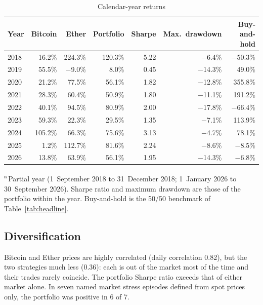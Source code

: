 \documentclass[11pt,a4paper]{article}
\newcommand{\1}{\mathbf{1}}
\begin{document}
\begin{table}[tbp]
\centering\small
\begin{threeparttable}
\caption{Calendar-year returns}\label{tab:annual}
\begin{tabular}{lrrrrrr}
\toprule
Year & Bitcoin & Ether & Portfolio & Sharpe & Max.~drawdown & Buy-and-hold \\
\midrule
2018\tnote{a} & 16.2\% & 224.3\% & 120.3\% & 5.22 & \ensuremath{-}6.4\% & \ensuremath{-}50.3\% \\
2019 & 55.5\% & \ensuremath{-}9.0\% & 8.0\% & 0.45 & \ensuremath{-}14.3\% & 49.0\% \\
2020 & 21.2\% & 77.5\% & 56.1\% & 1.82 & \ensuremath{-}12.8\% & 355.8\% \\
2021 & 28.3\% & 60.4\% & 50.9\% & 1.80 & \ensuremath{-}11.1\% & 191.2\% \\
2022 & 40.1\% & 94.5\% & 80.9\% & 2.00 & \ensuremath{-}17.8\% & \ensuremath{-}66.4\% \\
2023 & 59.3\% & 22.3\% & 29.5\% & 1.35 & \ensuremath{-}7.1\% & 113.9\% \\
2024 & 105.2\% & 66.3\% & 75.6\% & 3.13 & \ensuremath{-}4.7\% & 78.1\% \\
2025 & 1.2\% & 112.7\% & 81.6\% & 2.24 & \ensuremath{-}8.6\% & \ensuremath{-}8.5\% \\
2026\tnote{a} & 13.8\% & 63.9\% & 56.1\% & 1.95 & \ensuremath{-}14.3\% & \ensuremath{-}6.8\% \\
\bottomrule
\end{tabular}
\begin{tablenotes}[flushleft]\footnotesize
\item \textsuperscript{a}\,Partial year (1~September 2018 to 31~December 2018; 1~January 2026 to 30~September 2026). Sharpe ratio and maximum drawdown are those of the portfolio within the year. Buy-and-hold is the 50/50 benchmark of Table~\ref{tab:headline}.
\end{tablenotes}
\end{threeparttable}
\end{table}

\subsection{Diversification}

Bitcoin and Ether prices are highly correlated (daily correlation 0.82), but the two strategies much less (0.36): each is out of the market most of the time and their trades rarely coincide. The portfolio Sharpe ratio exceeds that of either market alone. In seven named market stress episodes defined from spot prices only, the portfolio was positive in 6 of 7.
\end{document}
